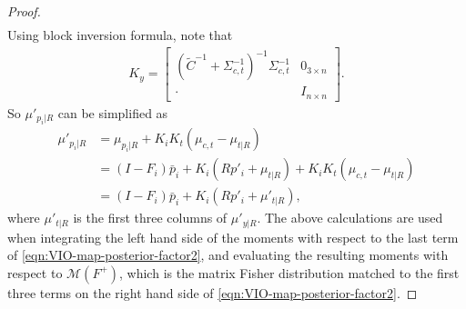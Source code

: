 \begin{proof}
\begin{align*}
	\end{align*}
	Using block inversion formula, note that
	\begin{align*}
		K_y = \begin{bmatrix} \left( \tilde{C}^{-1} + \Sigma_{c,t}^{-1} \right)^{-1} \Sigma_{c,t}^{-1} & 0_{3\times n} \\ \cdot & I_{n\times n} \end{bmatrix}.
	\end{align*}
	So $\mu'_{p_i|R}$ can be simplified as
	\begin{align*}
		\mu'_{p_i|R} &= \mu_{p_i|R} + K_iK_t(\mu_{c,t}-\mu_{t|R}) \\
		&= (I-F_i)\bar{p}_i + K_i(Rp'_i+\mu_{t|R}) + K_iK_t(\mu_{c,t} - \mu_{t|R}) \\
		&= (I-F_i)\bar{p}_i + K_i(Rp'_i+\mu'_{t|R}),
	\end{align*}
	where $\mu'_{t|R}$ is the first three columns of $\mu'_{y|R}$.
	The above calculations are used when integrating the left hand side of the moments with respect to the last term of \eqref{eqn:VIO-map-posterior-factor2}, and evaluating the resulting moments with respect to $\mathcal{M}(F^+)$, which is the matrix Fisher distribution matched to the first three terms on the right hand side of \eqref{eqn:VIO-map-posterior-factor2}.
\end{proof}
